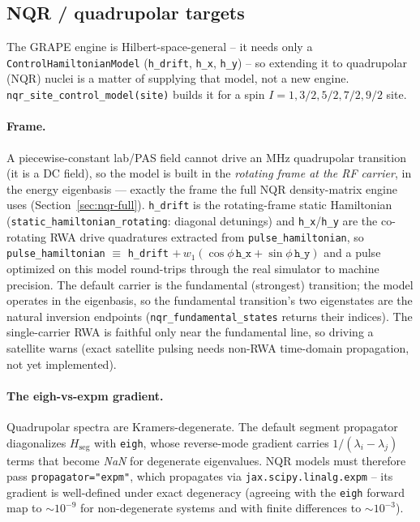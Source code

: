 \documentclass[11pt,oneside]{report}
\newcommand{\code}[1]{\texttt{#1}}
\begin{document}
\subsection{NQR / quadrupolar targets}
\label{sec:grape-nqr}

The GRAPE engine is Hilbert-space-general -- it needs only a
\code{ControlHamiltonianModel} (\code{h\_drift}, \code{h\_x}, \code{h\_y}) --
so extending it to quadrupolar (NQR) nuclei is a matter of supplying that model,
not a new engine. \code{nqr\_site\_control\_model(site)} builds it for a spin
\(I = 1, 3/2, 5/2, 7/2, 9/2\) site.

\paragraph{Frame.} A piecewise-constant lab/PAS field cannot drive an MHz
quadrupolar transition (it is a DC field), so the model is built in the
\emph{rotating frame at the RF carrier}, in the energy eigenbasis --- exactly
the frame the full NQR density-matrix engine uses
(Section~\ref{sec:nqr-full}). \code{h\_drift} is the rotating-frame static
Hamiltonian (\code{static\_hamiltonian\_rotating}: diagonal detunings) and
\code{h\_x}/\code{h\_y} are the co-rotating RWA drive quadratures extracted from
\code{pulse\_hamiltonian}, so \code{pulse\_hamiltonian} \(\equiv\)
\code{h\_drift} \(+\, w_1(\cos\phi\,\code{h\_x} + \sin\phi\,\code{h\_y})\) and a
pulse optimized on this model round-trips through the real simulator to machine
precision. The default carrier is the fundamental (strongest) transition; the
model operates in the eigenbasis, so the fundamental transition's two
eigenstates are the natural inversion endpoints (\code{nqr\_fundamental\_states}
returns their indices). The single-carrier RWA is faithful only near the
fundamental line, so driving a satellite warns (exact satellite pulsing needs
non-RWA time-domain propagation, not yet implemented).

\paragraph{The eigh-vs-expm gradient.} Quadrupolar spectra are Kramers-degenerate.
The default segment propagator diagonalizes \(H_{\text{seg}}\) with
\code{eigh}, whose reverse-mode gradient carries \(1/(\lambda_i-\lambda_j)\)
terms that become \emph{NaN} for degenerate eigenvalues. NQR models must
therefore pass \code{propagator="expm"}, which propagates via
\code{jax.scipy.linalg.expm} -- its gradient is well-defined under exact
degeneracy (agreeing with the \code{eigh} forward map to \(\sim 10^{-9}\) for
non-degenerate systems and with finite differences to \(\sim 10^{-3}\)).
\end{document}

